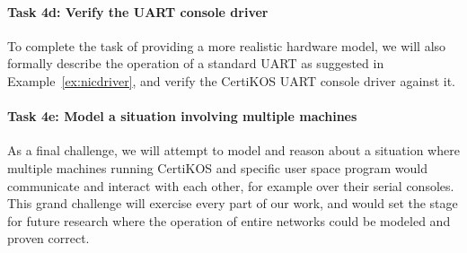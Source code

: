 \vspace*{-2ex}
\paragraph*{Task 4d: Verify the UART console driver}

To complete the task of providing a more realistic hardware model,
we will also formally describe the operation of a standard UART
as suggested in Example~\ref{ex:nicdriver},
and verify the CertiKOS UART console driver against it.

\vspace*{-2ex}
\paragraph*{Task 4e: Model a situation involving multiple machines}

As a final challenge,
we will attempt to model and reason about
a situation where multiple machines running CertiKOS
and specific user space program
would communicate and interact with each other,
for example over their serial consoles.
This grand challenge will exercise every part of our work,
and would set the stage for future research
where the operation of entire networks 
could be modeled and proven correct.

